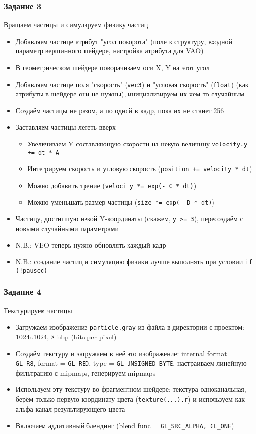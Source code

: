 \documentclass{beamer}
\begin{document}
\begin{frame}[fragile]
\frametitle{Задание 3}
\fontsize{8pt}{8pt}
Вращаем частицы и симулируем физику частиц
\begin{itemize}
\item Добавляем частице атрибут "угол поворота" (поле в структуру, входной параметр вершинного шейдере, настройка атрибута для VAO)
\pause
\item В геометрическом шейдере поворачиваем оси X, Y на этот угол
\pause
\item Добавляем частице поля "скорость" (\verb|vec3|) и "угловая скорость" (\verb|float|) (как атрибуты в шейдере они не нужны), инициализируем их чем-то случайным
\pause
\item Создаём частицы не разом, а по одной в кадр, пока их не станет 256
\pause
\item Заставляем частицы лететь вверх
\begin{itemize}
\item Увеличиваем Y-составляющую скорости на некую величину \verb|velocity.y += dt * A|
\item Интегрируем скорость и угловую скорость (\verb|position += velocity * dt|)
\item Можно добавить трение (\verb|velocity *= exp(- C * dt)|)
\item Можно уменьшать размер частицы (\verb|size *= exp(- D * dt)|)
\end{itemize}
\pause
\item Частицу, достигшую некой Y-координаты (скажем, \verb|y >= 3|), пересоздаём с новыми случайными параметрами
\pause
\item N.B.: VBO теперь нужно обновлять каждый кадр
\item N.B.: создание частиц и симуляцию физики лучше выполнять при условии \verb|if (!paused)|
\end{itemize}
\end{frame}

\begin{frame}[fragile]
\frametitle{Задание 4}
Текстурируем частицы
\begin{itemize}
\item Загружаем изображение \verb|particle.gray| из файла в директории с проектом: 1024x1024, 8 bbp (bits per pixel)
\pause
\item Создаём текстуру и загружаем в неё это изображение: internal format = \verb|GL_R8|, format = \verb|GL_RED|, type = \verb|GL_UNSIGNED_BYTE|, настраиваем линейную фильтрацию с mipmaps, генерируем mipmaps
\pause
\item Используем эту текстуру во фрагментном шейдере: текстура одноканальная, берём только первую координату цвета (\verb|texture(...).r|) и используем как альфа-канал результирующего цвета
\pause
\item Включаем аддитивный блендинг (blend func = \verb|GL_SRC_ALPHA, GL_ONE|)
\end{itemize}
\end{frame}
\end{document}
